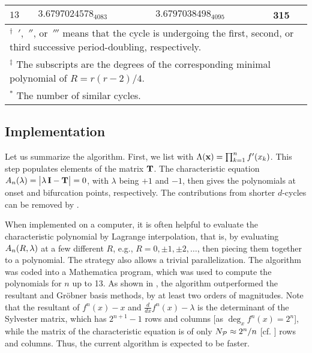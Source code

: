 \documentclass{ws-ijbc}
\begin{document}
\begin{table}[h]
{\begin{tabular}{llll}
$13$    & $3.6797024578_{4083}$ &  $3.6797038498_{4095}$  & 315 \\
\hline
\multicolumn{4}{p{\linewidth}}{
$^\dagger$
  $\,'$, $\,''$, or $\,'''$ means
    that the cycle is undergoing
    the first, second, or third successive period-doubling, respectively.
} \\
\multicolumn{4}{p{\linewidth}}{
$^\ddagger$
  The subscripts are the degrees of the corresponding minimal polynomial
    of $R = r(r-2)/4$.
} \\
\multicolumn{4}{p{\linewidth}}{
$^*$
  The number of similar cycles.
} \\
\hline
\end{tabular}
\label{tab:rval}
}
\end{table}





\subsection{\label{sec:end}Implementation}


Let us summarize the algorithm.
%
First, we list   with $\Lambda(\mathbf{x}) = \prod_{k=1}^n f'(x_k)$.
This step populates elements of the matrix $\mathbf{T}$.
%
The characteristic equation $A_n(\lambda) = \big|\lambda \, \mathbf{I} - \mathbf{T}\big| = 0$,
with $\lambda$ being $+1$ and $-1$, then gives
the polynomials at onset and bifurcation points, respectively.
%
The contributions from shorter $d$-cycles
  can be removed by
  .
%


When implemented on a computer,
it is often helpful to evaluate the characteristic polynomial
by Lagrange interpolation,
that is, by evaluating $A_n(R, \lambda)$ at a few different $R$,
e.g., $R = 0, \pm1, \pm2,\ldots$, then piecing them together
to a polynomial.
The strategy also allows a trivial parallelization.
%
The algorithm was coded into a Mathematica program,
which was used to compute the polynomials for $n$ up to 13.
%
As shown in , the algorithm
outperformed the resultant \cite{burm} and
  Gr\"obner basis \cite{kk1} methods,
  by at least two orders of magnitudes.
%
Note that the resultant of $f^n(x)-x$ and $\frac{d}{dx}f^n(x)-\lambda$
  is the determinant of the Sylvester matrix, which has
  $2^{n+1}-1$ rows and columns
  [as $\deg_x f^n(x) = 2^n$],
  while the matrix of the characteristic equation 
  is of only $N_\mathcal P \approx 2^n/n$ [cf. ] rows and columns.
Thus, the current algorithm is expected to be faster.
\end{document}
